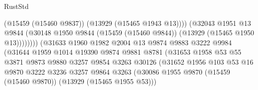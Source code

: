 \begin{lexlean}{RustStd}
\begin{coremodule}
                                              (@15459 (@15460 @9837))
                                              (@13929 (@15465 @1943 @13))))
                                          (@32043
                                            @1951
                                            @13
                                            @9844
                                            (@30148
                                              @1950
                                              @9844
                                              (@15459 (@15460 @9844))
                                              (@13929 (@15465 @1950 @13))))))))
                                  (@31633
                                    @1960
                                    @1982
                                    @2004
                                    @13
                                    @9874
                                    @9883
                                    @3222
                                    @9984
                                    (@31644
                                      @1959
                                      @1014
                                      @19390
                                      @9874
                                      @9881
                                      @8781
                                      (@31653
                                        @1958
                                        @53
                                        @55
                                        @3871
                                        @9873
                                        @9880
                                        @3257
                                        @9854
                                        @3263
                                        @30126
                                        (@31652
                                          @1956
                                          @103
                                          @53
                                          @16
                                          @9870
                                          @3222
                                          @3236
                                          @3257
                                          @9864
                                          @3263
                                          (@30086
                                            @1955
                                            @9870
                                            (@15459 (@15460 @9870))
                                            (@13929 (@15465 @1955 @53)))

\end{coremodule}
\end{lexlean}

